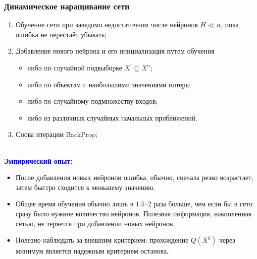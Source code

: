 \documentclass[unicode, notheorems]{beamer}
\begin{document}
\begin{frame}
	\frametitle{Динамическое наращивание сети}
	
	
	\begin{enumerate}
		\item Обучение сети при заведомо недостаточном числе нейронов $H \ll n$, пока ошибка не перестаёт убывать;
		\item Добавление нового нейрона и его инициализация путем обучения 
		\begin{itemize}
			\item либо по случайной подвыборке $X^{'} \subseteq X^n$;
			\item либо по объектам с наибольшими значениями потерь;
			\item либо по случайному подмножеству входов;
			\item либо из различных случайных начальных приближений.
		\end{itemize}
		\item Снова итерации BackProp;
	\end{enumerate}

\\

\textcolor{blue}{\bfseries Эмпирический опыт:} 
				\begin{itemize}
		\item\small{После добавления новых нейронов ошибка, обычно, сначала резко возрастает, затем быстро сходится к меньшему значению.}
			\item	\small{
		Общее время обучения обычно лишь в $1.5$--$2$ раза больше, чем если бы в сети сразу было нужное количество нейронов. Полезная информация, накопленная сетью, не теряется при добавлении новых нейронов.} 
	\item 	 \small{Полезно наблюдать за внешним критерием: прохождение $Q(X^k)$ через минимум является надежным критерием останова.} 
			\end{itemize}

\end{frame} 
\end{document}
